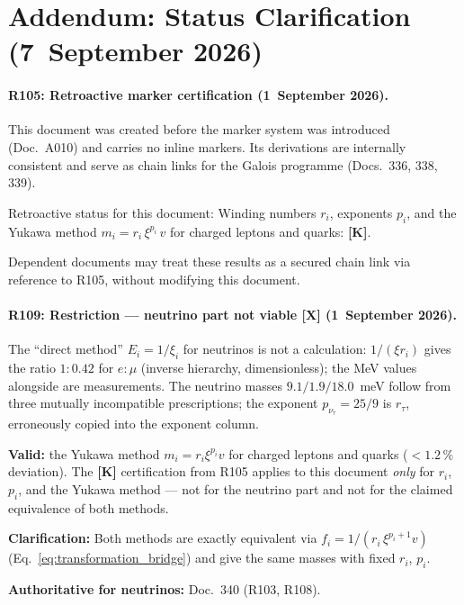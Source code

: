 \section*{Addendum: Status Clarification (7~September 2026)}

\paragraph{R105: Retroactive marker certification (1~September 2026).}
This document was created before the marker system was introduced (Doc.~A010)
and carries no inline markers. Its derivations are internally consistent and
serve as chain links for the Galois programme (Docs.~336, 338, 339).

Retroactive status for this document:
Winding numbers $r_i$, exponents $p_i$, and the Yukawa method
$m_i = r_i\,\xi^{p_i}\,v$ for charged leptons and quarks: \textbf{[K]}.

Dependent documents may treat these results as a secured chain link
via reference to R105, without modifying this document.

\paragraph{R109: Restriction --- neutrino part not viable \textbf{[X]} (1~September 2026).}
The ``direct method'' $E_i = 1/\xi_i$ for neutrinos is not a calculation:
$1/(\xi r_i)$ gives the ratio $1:0.42$ for $e:\mu$ (inverse hierarchy,
dimensionless); the MeV values alongside are measurements.
The neutrino masses $9.1/1.9/18.0$~meV follow from three mutually
incompatible prescriptions; the exponent $p_{\nu_\tau}=25/9$ is $r_\tau$,
erroneously copied into the exponent column.

\textbf{Valid:} the Yukawa method $m_i=r_i\xi^{p_i}v$ for charged leptons
and quarks ($<1.2\,\%$ deviation). The \textbf{[K]} certification from R105
applies to this document \emph{only} for $r_i$, $p_i$, and the Yukawa method
--- not for the neutrino part and not for the claimed equivalence of both methods.

\textbf{Clarification:} Both methods are exactly
equivalent via $f_i=1/(r_i\,\xi^{p_i+1}v)$ (Eq.~\ref{eq:transformation_bridge}) and
give the same masses with fixed $r_i$, $p_i$.

\textbf{Authoritative for neutrinos:} Doc.~340 (R103, R108).
